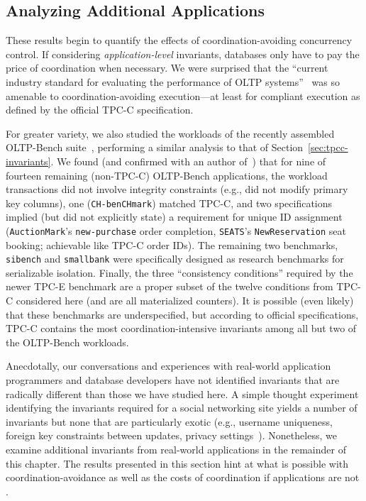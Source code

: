 \subsection{Analyzing Additional Applications}

These results begin to quantify the effects of coordination-avoiding
concurrency control. If considering \textit{application-level}
invariants, databases only have to pay the price of coordination when
necessary. We were surprised that the ``current industry standard for
evaluating the performance of OLTP systems''~\cite{oltpbench} was so
amenable to coordination-avoiding execution---at least for compliant
execution as defined by the official TPC-C specification.

For greater variety, we also studied the workloads of the recently
assembled OLTP-Bench suite~\cite{oltpbench}, performing a similar
analysis to that of Section~\ref{sec:tpcc-invariants}. We found (and
confirmed with an author of~\cite{oltpbench}) that for nine of
fourteen remaining (non-TPC-C) OLTP-Bench applications, the workload
transactions did not involve integrity constraints (e.g., did not
modify primary key columns), one (\texttt{CH-benCHmark}) matched
TPC-C, and two specifications implied (but did not explicitly state) a
requirement for unique ID assignment (\texttt{AuctionMark}'s
\texttt{new-purchase} order completion, \texttt{SEATS}'s
\texttt{NewReservation} seat booking; achievable like TPC-C order
IDs). The remaining two benchmarks, \texttt{sibench} and
\texttt{smallbank} were specifically designed as research benchmarks
for serializable isolation. Finally, the three ``consistency
conditions'' required by the newer TPC-E benchmark are a proper subset
of the twelve conditions from TPC-C considered here (and are all
materialized counters). It is possible (even likely) that these
benchmarks are underspecified, but according to official
specifications, TPC-C contains the most coordination-intensive
invariants among all but two of the OLTP-Bench workloads.

Anecdotally, our conversations and experiences with real-world
application programmers and database developers have not identified
invariants that are radically different than those we have studied
here. A simple thought experiment identifying the invariants required
for a social networking site yields a number of invariants but none
that are particularly exotic (e.g., username uniqueness, foreign key
constraints between updates, privacy
settings~\cite{pnuts,ramp-sigmod14}). Nonetheless, we examine
additional invariants from real-world applications in the remainder of
this chapter. The results presented in this section hint at what is
possible with coordination-avoidance as well as the costs of
coordination if applications are not \iconfluent.

